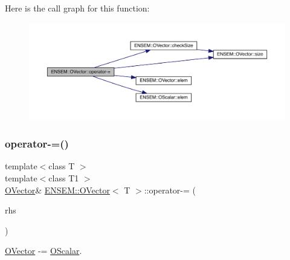 Here is the call graph for this function\+:
\nopagebreak
\begin{figure}[H]
\begin{center}
\leavevmode
\includegraphics[width=350pt]{d0/d8d/classENSEM_1_1OVector_ae2ae62360c5eb29827cb7e3d5556859f_cgraph}
\end{center}
\end{figure}
\mbox{\label{classENSEM_1_1OVector_ae2ae62360c5eb29827cb7e3d5556859f}} 
\subsubsection{\texorpdfstring{operator-\/=()}{operator-=()}\hspace{0.1cm}{\footnotesize\ttfamily [3/6]}}
{\footnotesize\ttfamily template$<$class T $>$ \\
template$<$class T1 $>$ \\
\mbox{\hyperlink{classENSEM_1_1OVector}{O\+Vector}}\& \mbox{\hyperlink{classENSEM_1_1OVector}{E\+N\+S\+E\+M\+::\+O\+Vector}}$<$ T $>$\+::operator-\/= (\begin{DoxyParamCaption}\item[{const \mbox{\hyperlink{classENSEM_1_1OScalar}{O\+Scalar}}$<$ T1 $>$ \&}]{rhs }\end{DoxyParamCaption})\hspace{0.3cm}{\ttfamily [inline]}}



\mbox{\hyperlink{classENSEM_1_1OVector}{O\+Vector}} -\/= \mbox{\hyperlink{classENSEM_1_1OScalar}{O\+Scalar}}. 

